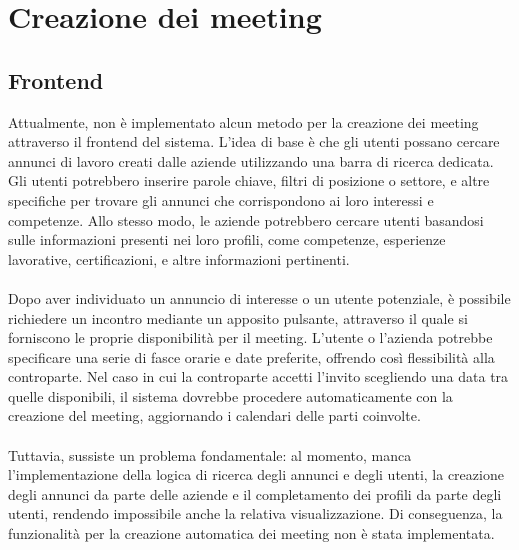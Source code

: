 \section{Creazione dei meeting}
\subsection{Frontend}
Attualmente, non è implementato alcun metodo per la creazione dei meeting attraverso il frontend del sistema. 
L'idea di base è che gli utenti possano cercare annunci di lavoro creati dalle aziende utilizzando una barra di ricerca dedicata.
Gli utenti potrebbero inserire parole chiave, filtri di posizione o settore, e altre specifiche per trovare gli annunci 
che corrispondono ai loro interessi e competenze. Allo stesso modo, le aziende potrebbero cercare utenti basandosi 
sulle informazioni presenti nei loro profili, come competenze, esperienze lavorative, certificazioni, e altre informazioni pertinenti. 
\\
\\
Dopo aver individuato un annuncio di interesse o un utente potenziale, è possibile richiedere un incontro 
mediante un apposito pulsante, attraverso il quale si forniscono le proprie disponibilità per il meeting. 
L'utente o l'azienda potrebbe specificare una serie di fasce orarie e date preferite, offrendo così flessibilità alla controparte. 
Nel caso in cui la controparte accetti l'invito scegliendo una data tra quelle disponibili, il sistema 
dovrebbe procedere automaticamente con la creazione del meeting, aggiornando i calendari delle parti coinvolte.
\\
\\
Tuttavia, sussiste un problema fondamentale: al momento, manca l'implementazione della logica di ricerca degli annunci 
e degli utenti, la creazione degli annunci da parte delle aziende e il completamento dei profili da parte degli utenti, 
rendendo impossibile anche la relativa visualizzazione. Di conseguenza, la funzionalità per la creazione automatica 
dei meeting non è stata implementata.
